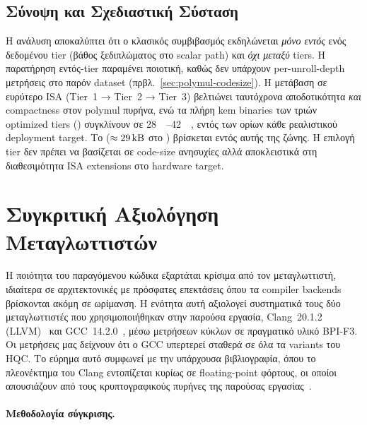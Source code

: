 \subsection{Σύνοψη και Σχεδιαστική Σύσταση}
\label{ssec:codesize-summary}

Η ανάλυση αποκαλύπτει ότι ο κλασικός συμβιβασμός  εκδηλώνεται \emph{μόνο εντός} ενός δεδομένου tier
(βάθος ξεδιπλώματος στο scalar path) και \emph{όχι μεταξύ} tiers. Η παρατήρηση εντός-tier παραμένει ποιοτική, καθώς δεν υπάρχουν per-unroll-depth μετρήσεις στο παρόν dataset (πρβλ.\ \cref{sec:polymul-codesize}).
Η μετάβαση σε ευρύτερο ISA (Tier~1 → Tier~2 → Tier~3) βελτιώνει
ταυτόχρονα αποδοτικότητα \emph{και} compactness στον polymul πυρήνα,
ενώ τα πλήρη \gls{kem} binaries των τριών optimized tiers () συγκλίνουν σε \SIrange{28}{42}{\kilo\byte}, εντός των ορίων κάθε ρεαλιστικού deployment target. Το  ($\approx\SI{29}{\kilo\byte}$ στο ) βρίσκεται εντός αυτής της ζώνης.
Η επιλογή tier δεν πρέπει να βασίζεται σε code-size ανησυχίες αλλά
αποκλειστικά στη διαθεσιμότητα ISA extensions στο hardware target.

\fi
\section{Συγκριτική Αξιολόγηση Μεταγλωττιστών}
\label{sec:compiler-comparison}

Η ποιότητα του παραγόμενου κώδικα εξαρτάται κρίσιμα από τον μεταγλωττιστή,
ιδιαίτερα σε αρχιτεκτονικές με πρόσφατες επεκτάσεις όπου τα compiler backends
βρίσκονται ακόμη σε ωρίμανση. Η ενότητα αυτή αξιολογεί συστηματικά τους
δύο μεταγλωττιστές που χρησιμοποιήθηκαν στην παρούσα εργασία, Clang~20.1.2
(LLVM)~\cite{LLVM-20} και GCC~14.2.0~\cite{GCC-14}, μέσω μετρήσεων κύκλων σε
πραγματικό υλικό BPI-F3. Οι μετρήσεις μας δείχνουν ότι ο GCC υπερτερεί σταθερά σε όλα τα variants του
HQC. Το εύρημα αυτό συμφωνεί με την υπάρχουσα βιβλιογραφία, όπου το πλεονέκτημα
του Clang εντοπίζεται κυρίως σε floating-point φόρτους, οι οποίοι απουσιάζουν
από τους κρυπτογραφικούς πυρήνες της παρούσας
εργασίας~\cite{Li-LLVM-GCC-RISCV2025,CloserInTheGap2026}.

\paragraph{Μεθοδολογία σύγκρισης.}

